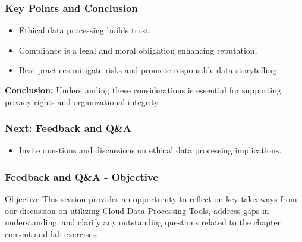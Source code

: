 \documentclass[aspectratio=169]{beamer}
\begin{document}
\begin{frame}[fragile]
    \frametitle{Key Points and Conclusion}
    \begin{itemize}
        \item Ethical data processing builds trust.
        \item Compliance is a legal and moral obligation enhancing reputation.
        \item Best practices mitigate risks and promote responsible data storytelling.
    \end{itemize}
    \vspace{0.5cm}
    \textbf{Conclusion:} Understanding these considerations is essential for supporting privacy rights and organizational integrity.
\end{frame}

\begin{frame}[fragile]
    \frametitle{Next: Feedback and Q\&A}
    \begin{itemize}
        \item Invite questions and discussions on ethical data processing implications.
    \end{itemize}
\end{frame}

\begin{frame}[fragile]
    \frametitle{Feedback and Q\&A - Objective}
    \begin{block}{Objective}
        This session provides an opportunity to reflect on key takeaways from our discussion on utilizing Cloud Data Processing Tools, address gaps in understanding, and clarify any outstanding questions related to the chapter content and lab exercises.
    \end{block}
\end{frame}
\end{document}
